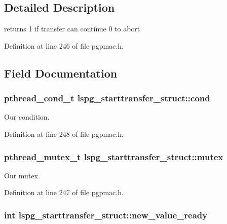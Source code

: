 \subsection{Detailed Description}
returns 1 if transfer can continue 0 to abort 

Definition at line 246 of file pgpmac.\-h.



\subsection{Field Documentation}
\hypertarget{structlspg__starttransfer__struct_a1a569a2afabd7910219ff9d2d48c1b38}{
\subsubsection[{cond}]{\setlength{\rightskip}{0pt plus 5cm}pthread\-\_\-cond\-\_\-t lspg\-\_\-starttransfer\-\_\-struct\-::cond}}\label{structlspg__starttransfer__struct_a1a569a2afabd7910219ff9d2d48c1b38}


Our condition. 



Definition at line 248 of file pgpmac.\-h.

\hypertarget{structlspg__starttransfer__struct_a47824bb2701a699d43a7a916e2010705}{
\subsubsection[{mutex}]{\setlength{\rightskip}{0pt plus 5cm}pthread\-\_\-mutex\-\_\-t lspg\-\_\-starttransfer\-\_\-struct\-::mutex}}\label{structlspg__starttransfer__struct_a47824bb2701a699d43a7a916e2010705}


Our mutex. 



Definition at line 247 of file pgpmac.\-h.

\hypertarget{structlspg__starttransfer__struct_ad3a6356e5ccce15c982ddecf9634999f}{
\subsubsection[{new\-\_\-value\-\_\-ready}]{\setlength{\rightskip}{0pt plus 5cm}int lspg\-\_\-starttransfer\-\_\-struct\-::new\-\_\-value\-\_\-ready}}\label{structlspg__starttransfer__struct_ad3a6356e5ccce15c982ddecf9634999f}


